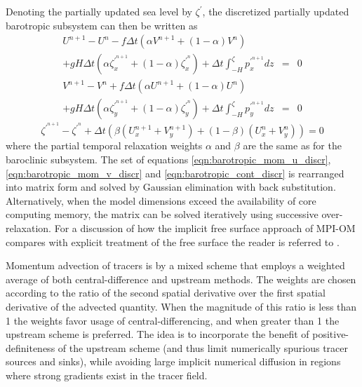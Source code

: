 Denoting the partially updated sea level by $\zeta^{\prime}$,
the discretized partially updated barotropic subsystem can then be written as 
\begin{eqnarray}
\label{eqn:barotropic_mom_u_discr}
U^{n+1} - U^{n} -f \Delta t
\left( \alpha V^{n+1} + (1-\alpha)V^{n} \right)
&&
\nonumber \\
+ g H \Delta t 
\left( \alpha \zeta_x^{\prime^{n+1}} + (1-\alpha) \zeta_x^{\prime^n}  \right)
+ \Delta t 
\int_{-H}^{\zeta}p_{x}^{\prime^{n+1}} dz
&=& 0
\\
\label{eqn:barotropic_mom_v_discr}
V^{n+1} - V^{n} +f \Delta t
\left( \alpha U^{n+1} + (1-\alpha)U^{n} \right)
&&
\nonumber \\
+ g H \Delta t
\left( \alpha \zeta_y^{\prime^{n+1}} + (1-\alpha) \zeta_y^{\prime^n}  \right)
+ \Delta t 
\int_{-H}^{\zeta}p_{y}^{\prime^{n+1}} dz
&=& 0
\end{eqnarray}
\begin{equation}
\label{eqn:barotropic_cont_discr}
\zeta^{\prime^{n+1}} - \zeta^{\prime^n} 
+ \Delta t 
\left( \beta ( U_x^{n+1} + V_y^{n+1}) + (1-\beta) (U_x^{n} + V_y^{n}) \right)
= 0
\end{equation}
where the partial temporal relaxation weights $\alpha$ and $\beta$ are the same as
for the baroclinic subsystem.
The set of equations \ref{eqn:barotropic_mom_u_discr}, \ref{eqn:barotropic_mom_v_discr}
and \ref{eqn:barotropic_cont_discr} is rearranged into matrix form and solved by
Gaussian elimination with back substitution.
Alternatively, when the model dimensions exceed the availability of core computing memory,
the matrix can be solved iteratively using successive over-relaxation.
For a discussion of how the implicit free surface approach of \mbox{MPI-OM}
compares with explicit treatment of the free surface the reader is referred to \citet{griffies2000}.

Momentum advection of tracers is by a mixed scheme that
employs a weighted average of both central-difference and upstream methods.
The weights are chosen according to the ratio of the second spatial derivative
over the first spatial derivative of the advected quantity.
When the magnitude of this ratio 
is less than 1 the weights favor usage of central-differencing,
and when greater than 1 the upstream scheme is preferred.
The idea is to incorporate the benefit of positive-definiteness of the upstream scheme
(and thus limit numerically spurious tracer sources and sinks),
while avoiding large implicit numerical diffusion in regions where strong gradients
exist in the tracer field.


\clearpage



  


